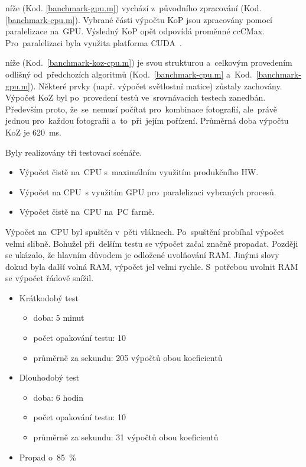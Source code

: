 níže (Kod. \ref{banchmark-gpu.m}) vychází z~původního zpracování (Kod. \ref{banchmark-cpu.m}). Vybrané části výpočtu KoP jsou zpracovány pomocí paralelizace na~GPU. Výsledný KoP opět odpovídá proměnné ccCMax. Pro~paralelizaci byla využita platforma CUDA~\cite{cuda}.

níže (Kod.~\ref{banchmark-koz-cpu.m}) je svou strukturou a~celkovým provedením odlišný od~předchozích algoritmů (Kod.~\ref{banchmark-cpu.m} a~Kod.~\ref{banchmark-gpu.m}). Některé prvky (např. výpočet světlostní matice) zůstaly zachovány. Výpočet KoZ byl po~provedení testů ve~srovnávacích testech zanedbán. Především proto, že~se~nemusí počítat pro~kombinace fotografií, ale~právě jednou pro~každou fotografii a~to~při~jejím pořízení. Průměrná doba výpočtu KoZ je 620~ms.

Byly realizovány tři testovací scénáře.
\begin{itemize}
	\setlength{\parskip}{0pt}
	\setlength{\itemsep}{0pt}
	\item {Výpočet čistě na~CPU s~maximálním využitím produkčního HW.}
	\item {Výpočet na CPU~s využitím GPU pro~paralelizaci vybraných procesů.}
	\item {Výpočet čistě na~CPU na~PC farmě.}
\end{itemize}

Výpočet na~CPU byl spuštěn v~pěti vláknech. Po~spuštění probíhal výpočet velmi slibně. Bohužel při~delším testu se výpočet začal značně propadat. Později se ukázalo, že hlavním důvodem je odložené uvolňování RAM. Jinými slovy dokud byla další volná RAM, výpočet jel velmi rychle. S~potřebou uvolnit RAM se výpočet řádově snížil.
\begin{itemize}
	\setlength{\parskip}{0pt}
	\setlength{\itemsep}{0pt}
	\item {Krátkodobý test}
		\begin{itemize}
			\setlength{\parskip}{0pt}
			\setlength{\itemsep}{0pt}
			\item {doba: 5 minut}
			\item {počet opakování testu: 10}
			\item {průměrně za sekundu: 205 výpočtů obou koeficientů}
		\end{itemize}
	\item {Dlouhodobý test}
		\begin{itemize}
			\setlength{\parskip}{0pt}
			\setlength{\itemsep}{0pt}
			\item {doba: 6 hodin}
			\item {počet opakování testu: 10}
			\item {průměrně za sekundu: 31 výpočtů obou koeficientů}
		\end{itemize}
	\item {Propad o~85~\%}
\end{itemize}

